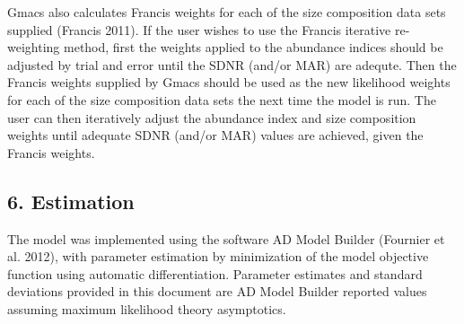 \documentclass[]{article}
\begin{document}
Gmacs also calculates Francis weights for each of the size composition
data sets supplied (Francis 2011). If the user wishes to use the Francis
iterative re-weighting method, first the weights applied to the
abundance indices should be adjusted by trial and error until the SDNR
(and/or MAR) are adequte. Then the Francis weights supplied by Gmacs
should be used as the new likelihood weights for each of the size
composition data sets the next time the model is run. The user can then
iteratively adjust the abundance index and size composition weights
until adequate SDNR (and/or MAR) values are achieved, given the Francis
weights.

\subsection{6. Estimation}\label{estimation}

The model was implemented using the software AD Model Builder (Fournier
et al. 2012), with parameter estimation by minimization of the model
objective function using automatic differentiation. Parameter estimates
and standard deviations provided in this document are AD Model Builder
reported values assuming maximum likelihood theory asymptotics.
\end{document}
